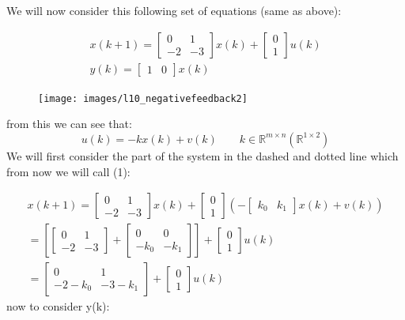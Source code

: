 \documentclass[a4paper,11pt]{article}
\begin{document}
	We will now consider this following set of equations (same as above):


	\begin{gather}
		x(k+1) = 
		\begin{bmatrix}
			0 & 1 \\
			-2 & -3
		\end{bmatrix}
		 x(k)+ 
		\begin{bmatrix}
			0\\1
		\end{bmatrix}
		u(k) \\
		y(k) = 
		\begin{bmatrix}
			1 & 0
		\end{bmatrix}
		x(k)
	\end{gather}
	\begin{figure}[htp]
		\centering
		\texttt{[image: images/l10\_negativefeedback2]}
	\end{figure}
	\FloatBarrier
	from this we can see that:
	\begin{equation}
		u(k) = -kx(k)+v(k) \qquad  k\in \mathbb{R}^{m\times n} (\mathbb{R}^{1\times 2})
	\end{equation}
	We will first consider the part of the system in the dashed and dotted line which from now we will call (1):

	\begin{gather}
		x(k+1) = 
		\begin{bmatrix}
			0 & 1 \\
			-2 & -3
		\end{bmatrix}
		 x(k)+ 
		\begin{bmatrix}
			0\\1
		\end{bmatrix}
		(-
		\begin{bmatrix}
			k_0 &k_1
		\end{bmatrix}
		x(k) + v(k)
		) \\
		=[		\begin{bmatrix}
			0 & 1 \\
			-2 & -3
		\end{bmatrix}
		+
		\begin{bmatrix}
			0 & 0 \\
			-k_0 & -k_1
		\end{bmatrix}
		]+
		\begin{bmatrix}
			0\\1
		\end{bmatrix}
		u(k) \\
		=
		\begin{bmatrix}
			0 & 1 \\
			-2-k_0 & -3-k_1
		\end{bmatrix}
		+
		\begin{bmatrix}
			0\\1
		\end{bmatrix}
		u(k)
	\end{gather}
	now to consider y(k):
\end{document}

